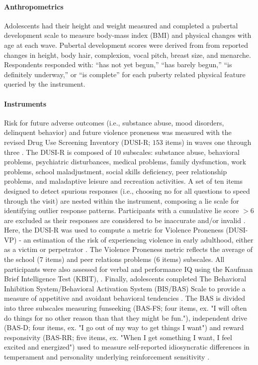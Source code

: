 \documentclass[utf8]{stylesheet}
\begin{document}
\paragraph{Anthropometrics} Adolescents had their height and weight measured and completed a pubertal development scale \citep{carskadon1993self} to measure body-mass index (BMI) and physical changes with age at each wave. Pubertal development scores were derived from from reported changes in height, body hair, complexion, vocal pitch, breast size, and menarche. Respondents responded with: “has not yet begun,” “has barely begun,” “is definitely underway,” or “is complete” for each puberty related physical feature queried by the instrument. 
\paragraph{Instruments} Risk for future adverse outcomes (i.e., substance abuse, mood disorders, delinquent behavior) and future violence proneness was measured with the revised Drug Use Screening Inventory (DUSI-R; $153$ items) in waves one through three \citep{tarter1994reliability}. The DUSI-R is composed of 10 subscales: substance abuse, behavioral problems, psychiatric disturbances, medical problems, family dysfunction, work problems, school maladjustment, social skills deficiency, peer relationship problems, and maladaptive leisure and recreation activities. A set of ten items designed to detect spurious responses (i.e., choosing no for all questions to speed through the visit) are nested within the instrument, composing a lie scale for identifying outlier response patterns. Participants with a cumulative lie score $>6$ are excluded as their responses are considered to be inaccurate and/or invalid \citep{dalla2003effects}. Here, the DUSI-R was used to compute a metric for Violence Proneness (DUSI-VP) - an estimation of the risk of experiencing violence in early adulthood, either as a victim or perpetrator \citep{kirisci2009violence}. The Violence Proneness metric reflects the average of the school ($7$ items) and peer relations problems ($6$ items) subscales. All participants were also assessed for verbal and performance IQ using the Kaufman Brief Intelligence Test (KBIT), \citep{kaufman2004kaufman}. Finally, adolescents completed The Behavioral Inhibition System/Behavioral Activation System (BIS/BAS) Scale  to provide a measure of appetitive and avoidant behavioral tendencies \citep{carver1994behavioral}. The BAS is divided into three subscales measuring funseeking (BAS-FS; four items, ex. "I will often do things for no other reason than that they might be fun."), independent drive (BAS-D; four items, ex. "I go out of my way to get things I want") and reward responsivity (BAS-RR; five items, ex. "When I get something I want, I feel excited and energized") used to measure self-reported idiosyncratic differences in temperament and personality underlying reinforcement sensitivity \citep{corr2004reinforcementsensitivity}.
\end{document}

